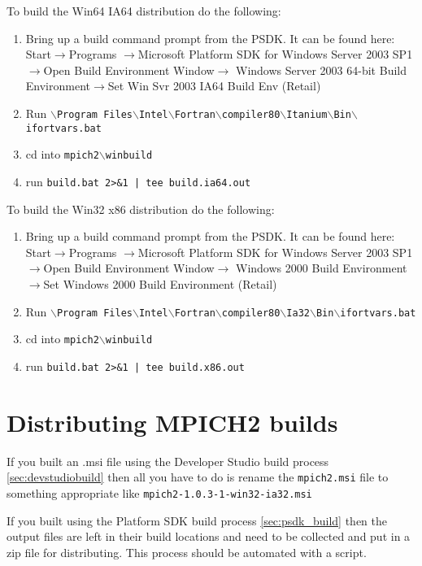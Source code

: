 \documentclass[dvipdfm,11pt]{article}
\begin{document}
To build the Win64 IA64 distribution do the following:
\begin{enumerate}
\item Bring up a build command prompt from the PSDK.  It can be found here: Start$\to$Programs
$\to$Microsoft Platform SDK for Windows Server 2003 SP1$\to$Open Build Environment Window$\to$
Windows Server 2003 64-bit Build Environment$\to$Set Win Svr 2003 IA64 Build Env (Retail)
\item Run \texttt{$\backslash$Program Files$\backslash$Intel$\backslash$Fortran$\backslash$compiler80$\backslash$Itanium$\backslash$Bin$\backslash$ifortvars.bat}
\item cd into \texttt{mpich2$\backslash$winbuild}
\item run \texttt{build.bat 2>\&1 | tee build.ia64.out}
\end{enumerate}

To build the Win32 x86 distribution do the following:
\begin{enumerate}
\item Bring up a build command prompt from the PSDK.  It can be found here: Start$\to$Programs
$\to$Microsoft Platform SDK for Windows Server 2003 SP1$\to$Open Build Environment Window$\to$
Windows 2000 Build Environment$\to$Set Windows 2000 Build Environment (Retail)
\item Run \texttt{$\backslash$Program Files$\backslash$Intel$\backslash$Fortran$\backslash$compiler80$\backslash$Ia32$\backslash$Bin$\backslash$ifortvars.bat}
\item cd into \texttt{mpich2$\backslash$winbuild}
\item run \texttt{build.bat 2>\&1 | tee build.x86.out}
\end{enumerate}

\section{Distributing MPICH2 builds}
\label{sec:distribute}

If you built an .msi file using the Developer Studio build process \ref{sec:devstudiobuild} then
all you have to do is rename the \texttt{mpich2.msi} file to something appropriate like
\texttt{mpich2-1.0.3-1-win32-ia32.msi}

If you built using the Platform SDK build process \ref{sec:psdk_build} then the output files
are left in their build locations and need to be collected and put in a zip file for
distributing.  This process should be automated with a script.
\end{document}
